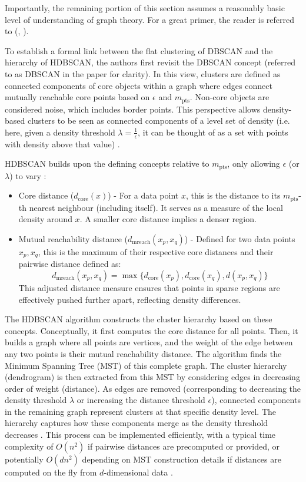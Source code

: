 \documentclass[10pt,oneside]{report}
\renewcommand{\citet}[1]{\citeauthor{#1}, \citeyear{#1}}
\begin{document}
Importantly, the remaining portion of this section assumes a reasonably basic level of understanding of graph theory. For a great primer, the reader is referred to (\citet{harris2008combinatorics}).

To establish a formal link between the flat clustering of DBSCAN and the hierarchy of HDBSCAN, the authors first revisit the DBSCAN concept (referred to as DBSCAN\* in the paper for clarity). In this view, clusters are defined as connected components of core objects within a graph where edges connect mutually reachable core points based on $\epsilon$ and $m_{\text{pts}}$. Non-core objects are considered noise, which includes border points. This perspective allows density-based clusters to be seen as connected components of a level set of density (i.e. here, given a density threshold $\lambda = \frac 1 \epsilon$, it can be thought of as a set with points with density above that value) \cite{campello2013density}.

HDBSCAN builds upon the defining concepts relative to $m_{\text{pts}}$, only allowing $\epsilon$ (or $\lambda$) to vary \cite{campello2013density}:
\begin{itemize}
    \item Core distance ($d_{\text{core}}(x)$) - For a data point $x$, this is the distance to its $m_{\text{pts}}$-th nearest neighbour (including itself). It serves as a measure of the local density around $x$. A smaller core distance implies a denser region.
    \item Mutual reachability distance ($d_{\text{mreach}}(x_p, x_q)$) - Defined for two data points $x_p, x_q$, this is the maximum of their respective core distances and their pairwise distance defined as:
        \[d_{\text{mreach}}(x_p, x_q) = \max \{ d_{\text{core}}(x_p), d_{\text{core}}(x_q), d(x_p, x_q) \}\]
    This adjusted distance measure ensures that points in sparse regions are effectively pushed further apart, reflecting density differences.
\end{itemize}

The HDBSCAN algorithm constructs the cluster hierarchy based on these concepts. Conceptually, it first computes the core distance for all points. Then, it builds a graph where all points are vertices, and the weight of the edge between any two points is their mutual reachability distance. The algorithm finds the Minimum Spanning Tree (MST) of this complete graph. The cluster hierarchy (dendrogram) is then extracted from this MST by considering edges in decreasing order of weight (distance). As edges are removed (corresponding to decreasing the density threshold $\lambda$ or increasing the distance threshold $\epsilon$), connected components in the remaining graph represent clusters at that specific density level. The hierarchy captures how these components merge as the density threshold decreases \cite{campello2013density}. This process can be implemented efficiently, with a typical time complexity of $O(n^2)$ if pairwise distances are precomputed or provided, or potentially $O(dn^2)$ depending on MST construction details if distances are computed on the fly from $d$-dimensional data \cite{campello2013density}.
\end{document}
